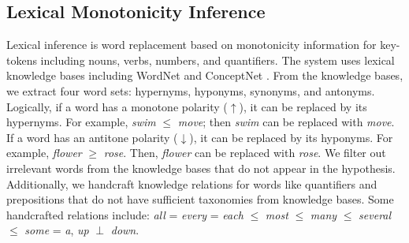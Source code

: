 \documentclass[11pt,a4paper]{article}
\begin{document}
\subsection{Lexical Monotonicity Inference} Lexical inference is word replacement based on monotonicity information for key-tokens including nouns, verbs, numbers, and quantifiers. The system uses lexical knowledge bases including WordNet \cite{wordnet} and ConceptNet \cite{conceptnet}. From the knowledge bases, we extract four word sets: hypernyms, hyponyms, synonyms, and antonyms. Logically, if a word has a monotone polarity ($\uparrow$), it can be replaced by its hypernyms. For example, \textit{swim} $\leq$ \textit{move}; then \textit{swim} can be replaced with \textit{move}. If a word has an antitone polarity ($\downarrow$), it can be replaced by its hyponyms. For example, \textit{flower} $\geq$ \textit{rose}. Then, \textit{flower} can be replaced with \textit{rose}. We filter out irrelevant words from the knowledge bases that do not appear in the hypothesis. Additionally, we handcraft knowledge relations for words like quantifiers and prepositions that do not have sufficient taxonomies from knowledge bases. Some handcrafted relations include: \textit{all} = \textit{every} = \textit{each} $\leq$ \textit{most} $\leq$ \textit{many} $\leq$  \textit{several} $\leq$ \textit{some} = \textit{a}, \textit{up} $\perp$ \textit{down}.

\begin{table*}[t!]
\centering
{}
\caption{\label{font-table} Examples of phrasal alignments detected by the syntactic variation module}
\end{table*}
\end{document}

